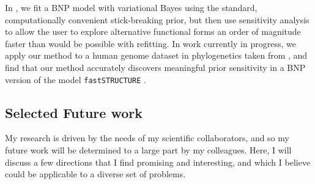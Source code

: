 In \citet{giordano:2018:bnpsensitivity}, we fit a BNP model with variational
Bayes \citep{blei:2006:dirichletbnp} using the standard, computationally
convenient stick-breaking prior, but then use sensitivity analysis to allow the
user to explore alternative functional forms an order of magnitude faster than
would be possible with refitting. In work currently in progress, we apply our
method to a human genome dataset in phylogenetics taken from
\citep{huang:2011:haplotype}, and find that our method accurately discovers
meaningful prior sensitivity in a BNP version of the model
\texttt{fastSTRUCTURE} \citep{raj:2014:faststructure}.


%


%
%
%
\subsection*{Selected Future work}

My research is driven by the needs of my scientific collaborators, and
so my future work will be determined to a large part by my colleagues.
Here, I will discuss a few directions that I find promising and interesting,
and which I believe could be applicable to a diverse set of problems.

